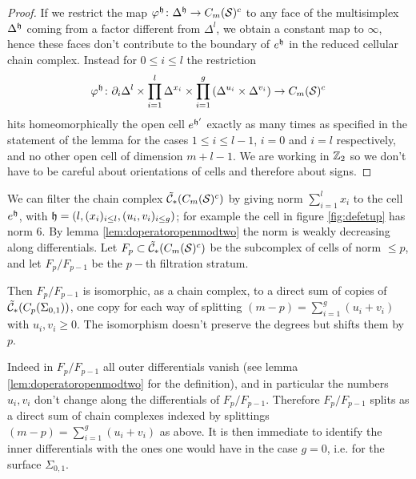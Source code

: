\begin{proof}
 If we restrict the map $\varphi^{\mathfrak{h}}\colon\Delta^{\mathfrak{h}}\to C_m(\mathcal{S})^c$ to any face of the multisimplex
 $\Delta^{\mathfrak{h}}$ coming from a factor different from $\Delta^l$,
 we obtain a constant map to $\infty$, hence these faces don't contribute
 to the boundary of $e^{\mathfrak{h}}$ in the reduced cellular chain complex. Instead for $0\leq i\leq l$ the restriction
 \[
  \varphi^{\mathfrak{h}}\colon\partial_i\Delta^l\times\prod_{i=1}^l\Delta^{x_i}\times\prod_{i=1}^g\left(\Delta^{u_i}\times\Delta^{v_i}\right)\to C_m(\mathcal{S})^c
 \]
 hits homeomorphically the open cell $e^{\mathfrak{h}'}$
 exactly as many times as specified in the statement
 of the lemma for the cases $1\leq i\leq l-1$,
 $i=0$ and $i=l$ respectively, and no other open cell of dimension $m+l-1$.
 We are working in $\mathbb{Z}_2$ so we don't have to be careful about orientations of cells
 and therefore about signs.
\end{proof}

We can filter the chain complex $\tilde{\mathcal{C}}_*(C_m(\mathcal{S})^c)$ by giving norm $\sum_{i=1}^lx_i$ to
the cell $e^{\mathfrak{h}}$, with $\mathfrak{h}=(l,(x_i)_{i\leq l},(u_i,v_i)_{i\leq g})$; for example
the cell in figure \ref{fig:defetup} has norm 6. By lemma \ref{lem:doperatoropenmodtwo}
the norm is weakly decreasing along differentials. Let $F_p\subset\tilde{\mathcal{C}}_*(C_m(\mathcal{S})^c)$ be the subcomplex of cells
of norm $\leq p$, and let $F_p/F_{p-1}$ be the $p-$th filtration stratum.

Then $F_p/F_{p-1}$ is isomorphic, as a chain complex, to a direct sum of copies of $\tilde{\mathcal{C}}_*(C_p(\Sigma_{0,1}))$,
one copy for each way of splitting $(m-p)=\sum_{i=1}^g (u_i+v_i)$ with $u_i,v_i\geq 0$. The isomorphism
doesn't preserve the degrees but shifts them by $p$.

Indeed in $F_p/F_{p-1}$ all outer
differentials vanish (see lemma \ref{lem:doperatoropenmodtwo}
for the definition), and in particular the numbers $u_i,v_i$
don't change along the differentials of $F_p/F_{p-1}$. Therefore $F_p/F_{p-1}$ splits as a direct sum
of chain complexes indexed by splittings $(m-p)=\sum_{i=1}^g (u_i+v_i)$ as above.
It is then immediate to identify the inner differentials
with the ones one would have in the case $g=0$, i.e. for the surface $\Sigma_{0,1}$.

